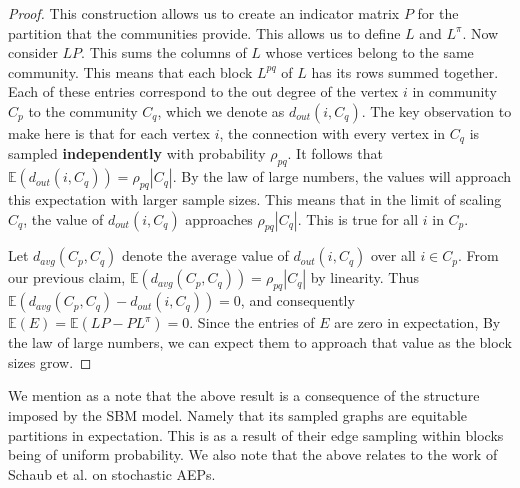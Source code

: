 \documentclass[%
 aip,
 amsmath,amssymb,
preprint,
reprint, onecolumn %
]{revtex4-1}
\begin{document}
\begin{proof}
    This construction allows us to create an indicator matrix $P$ for the partition that the communities provide. This allows us to define $L$ and $L^\pi$. Now consider $LP$. This sums the columns of $L$ whose vertices belong to the same community. This means that each block $L^{pq}$ of $L$ has its rows summed together. Each of these entries correspond to the out degree of the vertex $i$ in community $C_p$ to the community $C_q$, which we denote as $d_{out}(i,C_q)$. The key observation to make here is that for each vertex $i$, the connection with every vertex in $C_q$ is sampled \textbf{independently} with probability $\rho_{pq}$. It follows that $\mathbb{E}(d_{out}(i,C_q))=\rho_{pq} |C_q|$. By the law of large numbers, the values will approach this expectation with larger sample sizes. This means that in the limit of scaling $C_q$, the value of $d_{out}(i,C_q)$ approaches $\rho_{pq} |C_q|$. This is true for all $i$ in $C_p$. 
    
    Let $d_{avg}(C_p,C_q)$ denote the average value of $d_{out}(i,C_q)$ over all $i\in C_p$. From our previous claim, $\mathbb{E}(d_{avg}(C_p,C_q))=\rho_{pq} |C_q|$ by linearity. Thus $\mathbb{E}(d_{avg}(C_p,C_q) - d_{out}(i,C_q))=0$, and consequently $\mathbb{E}(E) = \mathbb{E}(LP - PL^\pi) = 0$. Since the entries of $E$ are zero in expectation, By the law of large numbers, we can expect them to approach that value as the block sizes grow.

\end{proof}

We mention as a note that the above result is a consequence of the structure imposed by the SBM model. Namely that its sampled graphs are equitable partitions in expectation. This is as a result of their edge sampling within blocks being of uniform probability. We also note that the above relates to the work of Schaub et al. on stochastic AEPs.\cite{schaub_hierarchical_2023}








\end{document}
